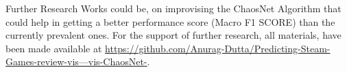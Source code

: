 \documentclass[runningheads]{llncs}
\begin{document}
Further Research Works could be, on improvising the ChaosNet Algorithm that could help in getting a better performance score (Macro F1 SCORE) than the currently prevalent ones. For the support of further research, all materials, have been made available at \href{https://github.com/Anurag-Dutta/Predicting-Steam-Games-review-vis---vis-ChaosNet-}{https://github.com/Anurag-Dutta/Predicting-Steam-Games-review-vis---vis-ChaosNet-}. 
\end{document}
